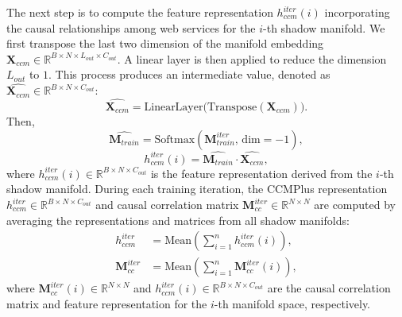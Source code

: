 




The next step is to compute the feature representation $h_{ccm}^{iter}(i)$ incorporating the causal relationships among web services for the \( i \)-th shadow manifold.
We first transpose the last two dimension of the manifold embedding $\mathbf{X}_{ccm} \in \mathbb{R}^{B\times N\times L_{out}\times C_{out}}$. 
A linear layer is then applied to reduce the dimension $L_{out}$ to \( 1 \). 
This process produces an intermediate value, denoted as $\widehat{\mathbf{X}_{ccm}} \in \mathbb{R}^{B \times N \times C_{out}}$:
\begin{equation}
\widehat{\mathbf{X}_{ccm}} =  \text{LinearLayer} \big( \text{Transpose} (\mathbf{X}_{ccm}) \big).
\label{eq:calculate_conv_val}
\end{equation}
Then,
\begin{equation}
\widehat{\mathbf{M}_{train}} = \mathrm{Softmax}(\mathbf{M}_{train}^{iter}, \, \text{dim} = -1),\nonumber
\end{equation}
\begin{equation}
h_{ccm}^{iter}(i) = \widehat{\mathbf{M}_{train}} \cdot \widehat{\mathbf{X}_{ccm}},
\label{eq:calculate_ccmplus_repre}
\end{equation}
where $h_{ccm}^{iter}(i) \in \mathbb{R}^{B \times N \times C_{out}}$ is the feature representation derived from the \( i \)-th shadow manifold. 
During each training iteration, the CCMPlus representation \( h_{ccm}^{iter} \in \mathbb{R}^{B\times N\times C_{out}} \) and causal correlation matrix \( \mathbf{M}_{cc}^{iter} \in \mathbb{R}^{N \times N}\) are computed by averaging the representations and matrices from all shadow manifolds:
\begin{align}
h_{ccm}^{iter} &= \text{Mean}(\sum_{i=1}^{n }h_{ccm}^{iter}(i)), \label{eq:calcualte_ccmplus_re_iter}\\
\mathbf{M}_{cc}^{iter} &= \text{Mean}(\sum_{i=1}^{n}\mathbf{M}_{cc}^{iter}(i)),\nonumber
\end{align}
where ${\mathbf{M}_{cc}^{iter}(i)} \in \mathbb{R}^{N \times N}$ and ${h_{ccm}^{iter}(i)} \in \mathbb{R}^{B\times N\times C_{out}}$ are the causal correlation matrix and feature representation for the $i$-th manifold space, respectively.
